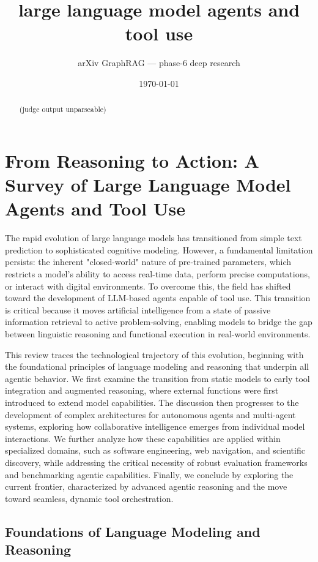 \documentclass[11pt]{article}
\title{large language model agents and tool use}
\author{arXiv GraphRAG --- phase-6 deep research}
\date{\today}
\begin{document}
\maketitle

\begin{abstract}
(judge output unparseable)
\end{abstract}

\section{From Reasoning to Action: A Survey of Large Language Model Agents and Tool Use}

The rapid evolution of large language models has transitioned from simple text prediction to sophisticated cognitive modeling. However, a fundamental limitation persists: the inherent "closed-world" nature of pre-trained parameters, which restricts a model's ability to access real-time data, perform precise computations, or interact with digital environments. To overcome this, the field has shifted toward the development of LLM-based agents capable of tool use. This transition is critical because it moves artificial intelligence from a state of passive information retrieval to active problem-solving, enabling models to bridge the gap between linguistic reasoning and functional execution in real-world environments.

This review traces the technological trajectory of this evolution, beginning with the foundational principles of language modeling and reasoning that underpin all agentic behavior. We first examine the transition from static models to early tool integration and augmented reasoning, where external functions were first introduced to extend model capabilities. The discussion then progresses to the development of complex architectures for autonomous agents and multi-agent systems, exploring how collaborative intelligence emerges from individual model interactions. We further analyze how these capabilities are applied within specialized domains, such as software engineering, web navigation, and scientific discovery, while addressing the critical necessity of robust evaluation frameworks and benchmarking agentic capabilities. Finally, we conclude by exploring the current frontier, characterized by advanced agentic reasoning and the move toward seamless, dynamic tool orchestration.

\subsection{Foundations of Language Modeling and Reasoning}
\end{document}
